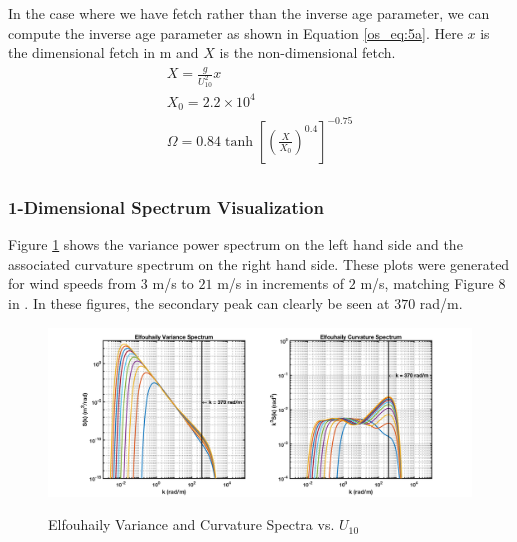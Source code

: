 In the case where we have fetch rather than the inverse age parameter, we can compute the inverse age parameter as shown in Equation \ref{os_eq:5a}. Here $x$ is the dimensional fetch in m and $X$ is the non-dimensional fetch.
\begin{equation}
\label{os_eq:5a}
\begin{gathered}
 X = \frac{g}{U_{10}^2}x\\
 X_0 = 2.2 \times 10^4 \\
 \Omega = 0.84\tanh\left[\left(\frac{X}{X_0} \right)^{0.4} \right]^{-0.75} \\
\end{gathered}
\end{equation}
\renewcommand{\baselinestretch}{2} \small\normalsize

\subsubsection{1-Dimensional Spectrum Visualization}
Figure \ref{os_fig:3} shows the variance power spectrum on the left hand side and the associated curvature spectrum on the right hand side. These plots were generated for wind speeds from $3$ m/s to $21$ m/s in increments of $2$ m/s, matching Figure 8 in \cite{elfouhaily}. In these figures, the secondary peak can clearly be seen at $370$ rad/m.
\begin{figure}[H]
  \begin{center}
\includegraphics[width=6in]{../media/Ocean_Surface/elf_variance_curvature_spectrum.png}
  \end{center}
  \renewcommand{\baselinestretch}{1} \small\normalsize
  \begin{quote}
    \caption[Elfouhaily Variance and Curvature Spectra vs. $U_{10}$]{Elfouhaily Variance and Curvature Spectra vs. $U_{10}$\label{os_fig:3}}
  \end{quote}
\end{figure}
\renewcommand{\baselinestretch}{2} \small\normalsize

